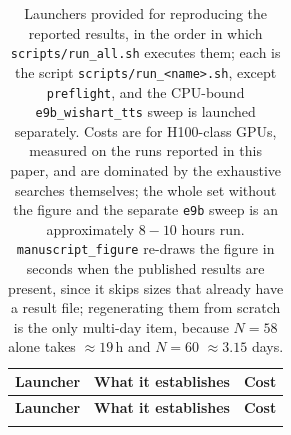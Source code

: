 \documentclass[preprint,12pt,a4paper]{elsarticle}
\begin{document}
\begin{longtable}{|p{4.2cm}|p{5.3cm}|p{2.0cm}|}
\caption{Launchers provided for reproducing the reported results, in the order in
which \texttt{scripts/run\_all.sh} executes them; each is the script
\texttt{scripts/run\_<name>.sh}, except \texttt{preflight}, and the CPU-bound
\texttt{e9b\_wishart\_tts} sweep is launched separately. Costs are for
H100-class GPUs, measured on the runs reported in this paper, and are dominated by the
exhaustive searches themselves; the whole set without the figure and the separate
\texttt{e9b} sweep is an approximately $8-10$ hours run.
\texttt{manuscript\_figure} re-draws the figure in seconds when the published
results are present, since it skips sizes that already have a result file;
regenerating them from scratch is the only multi-day item, because $N=58$ alone
takes $\approx\!19$\,h and $N=60$ $\approx\!3.15$ days.}
\label{tab:reproduction} \\

\hline
\textbf{Launcher} & \textbf{What it establishes} & \textbf{Cost} \\
\hline
\endfirsthead

\hline
\textbf{Launcher} & \textbf{What it establishes} & \textbf{Cost} \\
\hline
\endhead

\hline
\endfoot

\hline
\endlastfoot


\end{longtable}
\end{document}
